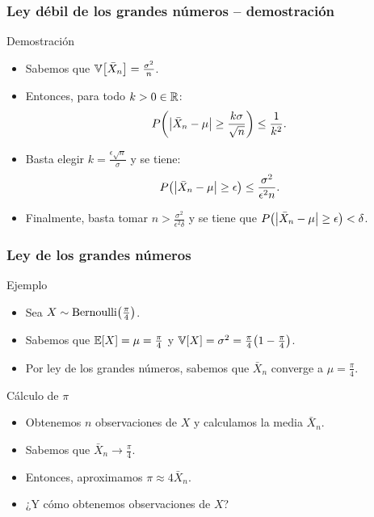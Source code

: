 \documentclass[table]{beamer}
\begin{document}
\begin{frame}
    \frametitle{Ley débil de los grandes números -- demostración}
   \begin{block}{Demostración}
        \begin{itemize}
            \item Sabemos que $\variance{\bar{X}_{n}} = \frac{\sigma^{2}}{n}$.
            \item Entonces, para todo $k > 0 \in \mathbb{R}$:
                \begin{equation*}
                    \prob{\vparens{\bar{X}_{n} - \mu} \geq \frac{k \sigma}{\sqrt{n}}} \leq \frac{1}{k^{2}} .
                \end{equation*}
            \item Basta elegir $k = \frac{\epsilon \sqrt{n}}{\sigma}$ y se tiene:
                \begin{equation*}
                    \prob{\vparens{\bar{X}_{n} - \mu} \geq \epsilon} \leq \frac{\sigma^{2}}{\epsilon^{2} n} .
                \end{equation*}
            \item Finalmente, basta tomar $n > \frac{\sigma^{2}}{\epsilon^{2} \delta}$ y se tiene que
                 $\prob{\vparens{\bar{X}_{n} - \mu} \geq \epsilon} < \delta$.
        \end{itemize}
    \end{block}
\end{frame}


\begin{frame}
    \frametitle{Ley de los grandes números}
    \begin{block}{Ejemplo}
        \begin{itemize}
            \item Sea $X \sim \bernoulli{\frac{\pi}{4}}$.
            \item Sabemos que $\expected{X} = \mu = \frac{\pi}{4}$ y $\variance{X} = \sigma^{2} = \frac{\pi}{4} \parens{1 - \frac{\pi}{4}}$.
            \item Por ley de los grandes números, sabemos que $\bar{X}_{n}$ converge a $\mu = \frac{\pi}{4}$.
        \end{itemize}
    \end{block}
    \begin{block}{Cálculo de $\pi$}
        \begin{itemize}
            \item Obtenemos $n$ observaciones de $X$ y calculamos la media $\bar{X}_{n}$.
            \item Sabemos que $\bar{X}_{n} \to \frac{\pi}{4}$.
            \item Entonces, aproximamos $\pi \approx 4 \bar{X}_{n}$.
            \item ¿Y cómo obtenemos observaciones de $X$?
        \end{itemize}
    \end{block}
\end{frame}
\end{document}
